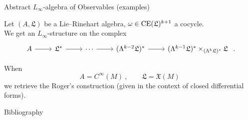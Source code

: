 \documentclass[beamer,10pt,handout]{standalone}  \Handouttrue
\begin{document}
\begin{frame}[fragile]{Abstract {$L_\infty$}-algebra of Observables (examples)}

  \begin{exblock}
    Let $(A, \mathfrak{L})$ be a Lie--Rinehart algebra, $\omega \in \mathrm{CE}(\mathfrak{L})^{k+1}$ a cocycle.
    \\
    We get an $L_\infty$-structure on the complex
	\begin{displaymath}
		\begin{tikzcd}[]
			A \arrow[r] &
			\mathfrak{L}^* \arrow[r] &
			\cdots \arrow[r] &
			(\Lambda^{k-2} \mathfrak{L})^* \arrow[r] &
			(\Lambda^{k-1} \mathfrak{L})^* \times_{(\Lambda^k \mathfrak{L})^*} \mathfrak{L}
		\end{tikzcd}~.
	\end{displaymath}
\end{exblock}
  \vfill\pause

\begin{exblock} 
	When 
   $$ A=C^\infty(M)~, \qquad  \mathfrak{L}=\mathfrak{X}(M)$$
   we retrieve the Roger's construction (given in the context of closed differential forms).
\end{exblock}

\end{frame}




\ifstandalone
\begin{frame}[t,allowframebreaks]{Bibliography}
	\printbibliography
\end{frame}
\fi



\end{document}
